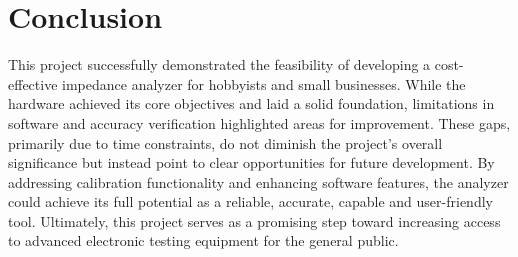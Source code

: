\chapter{Conclusion} \label{ch:Conclusion}
This project successfully demonstrated the feasibility of developing a cost-effective impedance analyzer for hobbyists and small businesses. While the hardware achieved its core objectives and laid a solid foundation, limitations in software and accuracy verification highlighted areas for improvement. These gaps, primarily due to time constraints, do not diminish the project's overall significance but instead point to clear opportunities for future development. By addressing calibration functionality and enhancing software features, the analyzer could achieve its full potential as a reliable, accurate, capable and user-friendly tool. Ultimately, this project serves as a promising step toward increasing access to advanced electronic testing equipment for the general public.



